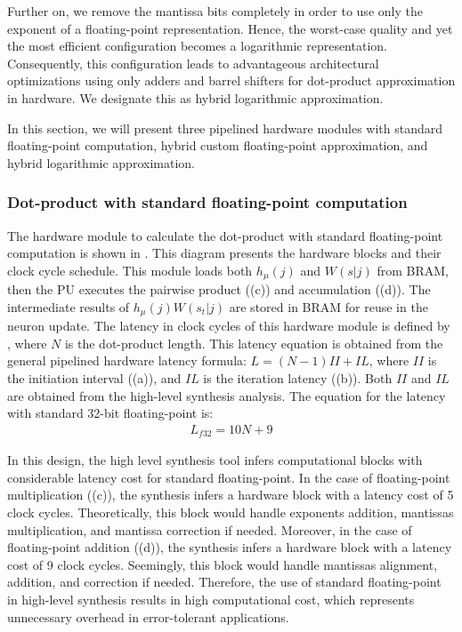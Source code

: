 Further on, we remove the mantissa bits completely in order to use only the exponent of a floating-point representation. Hence, the worst-case quality and yet the most efficient configuration becomes a logarithmic representation. Consequently, this configuration leads to advantageous architectural optimizations using only adders and barrel shifters for dot-product approximation in hardware. We designate this as hybrid logarithmic approximation.

In this section, we will present three pipelined hardware modules with standard floating-point computation, hybrid custom floating-point approximation, and hybrid logarithmic approximation.

\subsubsection{Dot-product with standard floating-point computation}
 The hardware module to calculate the dot-product with standard floating-point computation is shown in . This diagram presents the hardware blocks and their clock cycle schedule. This module loads both $h_\mu(j)$ and $W(s|j)$ from BRAM, then the PU executes the pairwise product ((c)) and accumulation ((d)). The intermediate results of $h_\mu(j) W(s_t|j)$ are stored in BRAM for reuse in the neuron update. The latency in clock cycles of this hardware module is defined by , where $N$ is the dot-product length. This latency equation is obtained from the general pipelined hardware latency formula: $L=\left(N-1\right)II+IL$, where $II$ is the initiation interval ((a)), and $IL$ is the iteration latency ((b)). Both $II$ and $IL$ are obtained from the high-level synthesis analysis. The equation for the latency with standard 32-bit floating-point is:
 \begin{eqnarray} \label{eq:dot_standard_float_latency}
 L_{f32}=10N+9
 \end{eqnarray}
 
In this design, the high level synthesis tool infers computational blocks with considerable latency cost for standard floating-point. In the case of floating-point multiplication ((c)), the synthesis infers a hardware block with a latency cost of 5 clock cycles. Theoretically, this block would handle exponents addition, mantissas multiplication, and mantissa correction if needed. Moreover, in the case of floating-point addition ((d)), the synthesis infers a hardware block with a latency cost of 9 clock cycles. Seemingly, this block would handle mantissas alignment, addition, and correction if needed. Therefore, the use of standard floating-point in high-level synthesis results in high computational cost, which represents unnecessary overhead in error-tolerant applications.


